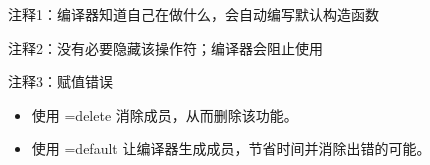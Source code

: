 {\footnotesize
注释1：编译器知道自己在做什么，会自动编写默认构造函数

注释2：没有必要隐藏该操作符；编译器会阻止使用

注释3：赋值错误
}


\begin{itemize}
\item
使用 =delete 消除成员，从而删除该功能。

\item
使用 =default 让编译器生成成员，节省时间并消除出错的可能。
\end{itemize}




























